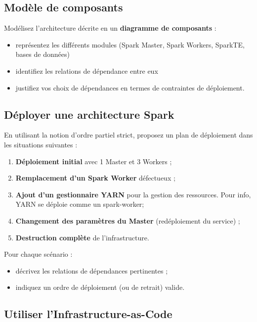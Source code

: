\documentclass{article}%
\begin{document}
\subsection{Modèle de composants}

Modélisez l'architecture décrite en un \textbf{diagramme de composants} :
\begin{itemize}
  \item représentez les différents modules (Spark Master, Spark Workers, SparkTE, bases de données)
  \item identifiez les relations de dépendance entre eux 
  \item justifiez vos choix de dépendances en termes de contraintes de déploiement.
\end{itemize}

\subsection{Déployer une architecture Spark}

En utilisant la notion d’ordre partiel strict, proposez un plan de déploiement dans les situations suivantes :
\begin{enumerate}
  \item \textbf{Déploiement initial} avec 1 Master et 3 Workers ;
  \item \textbf{Remplacement d’un Spark Worker} défectueux ;
  \item \textbf{Ajout d’un gestionnaire YARN} pour la gestion des ressources. Pour info, YARN se déploie comme un spark-worker;
  \item \textbf{Changement des paramètres du Master} (redéploiement du service) ;
  \item \textbf{Destruction complète} de l’infrastructure.
\end{enumerate}

Pour chaque scénario :
\begin{itemize}
  \item décrivez les relations de dépendances pertinentes ;
  \item indiquez un ordre de déploiement (ou de retrait) valide.
\end{itemize}

\subsection{Utiliser l'Infrastructure-as-Code}
\end{document}
